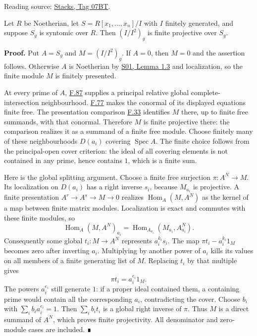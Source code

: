 \documentclass[11pt,a4paper,openany]{report}
\begin{document}
Reading source: \href{https://stacks.math.columbia.edu/tag/07BT}{Stacks, Tag 07BT}.

Let \(R\) be Noetherian, let \(S=R[x_1,\ldots,x_n]/I\) with \(I\) finitely generated, and suppose \(S_g\) is syntomic over \(R\). Then \((I/I^2)_g\) is finite projective over \(S_g\).

\textbf{Proof.} Put \(A=S_g\) and \(M=(I/I^2)_g\). If \(A=0\), then \(M=0\) and the assertion follows. Otherwise \(A\) is Noetherian by \href{https://github.com/KokunoYumeto/open-math-courses/blob/main/docs/courses/AG-RG/AG-RG-S01.md}{S01, Lemma 1.3} and localization, so the finite module \(M\) is finitely presented.

At every prime of \(A\), \hyperref[AG-RG-S05-algebra-lemma-syntomic]{F.87} supplies a principal relative global complete-intersection neighbourhood. \hyperref[AG-RG-S05-algebra-lemma-relative-global-complete-intersection-conormal]{F.77} makes the conormal of its displayed equations finite free. The presentation comparison \hyperref[AG-RG-S05-algebra-lemma-conormal-module-localize]{F.33} identifies \(M\) there, up to finite free summands, with that conormal. Therefore \(M\) is finite projective there: the comparison realizes it as a summand of a finite free module. Choose finitely many of these neighbourhoods \(D(a_i)\) covering \(\operatorname{Spec}A\). The finite choice follows from the principal-open cover criterion: the ideal of all covering elements is not contained in any prime, hence contains \(1\), which is a finite sum.

Here is the global splitting argument. Choose a finite free surjection \(\pi:A^N\to M\). Its localization on \(D(a_i)\) has a right inverse \(s_i\), because \(M_{a_i}\) is projective. A finite presentation \(A^r\to A^s\to M\to0\) realizes \(\operatorname{Hom}_A(M,A^N)\) as the kernel of a map between finite matrix modules. Localization is exact and commutes with these finite modules, so \[
\operatorname{Hom}_A(M,A^N)_{a_i}
=\operatorname{Hom}_{A_{a_i}}(M_{a_i},A_{a_i}^N).
\] Consequently some global \(t_i:M\to A^N\) represents \(a_i^{k_i}s_i\). The map \(\pi t_i-a_i^{k_i}1_M\) becomes zero after inverting \(a_i\). Multiplying by another power of \(a_i\) kills its values on all members of a finite generating list of \(M\). Replacing \(t_i\) by that multiple gives \[
\pi t_i=a_i^{e_i}1_M.
\] The powers \(a_i^{e_i}\) still generate \(1\): if a proper ideal contained them, a containing prime would contain all the corresponding \(a_i\), contradicting the cover. Choose \(b_i\) with \(\sum_i b_i a_i^{e_i}=1\). Then \(\sum_i b_i t_i\) is a global right inverse of \(\pi\). Thus \(M\) is a direct summand of \(A^N\), which proves finite projectivity. All denominator and zero-module cases are included. ∎
\end{document}
